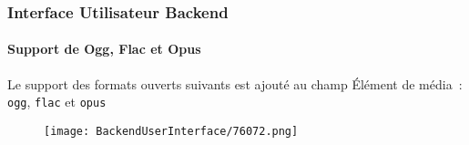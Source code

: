 \begin{frame}[fragile]
	\frametitle{Interface Utilisateur Backend}
	\framesubtitle{Support de Ogg, Flac et Opus}

	Le support des formats ouverts suivants est ajouté au champ Élément de média~:
	\texttt{ogg}, \texttt{flac} et \texttt{opus}

	\begin{figure}
		\texttt{[image: BackendUserInterface/76072.png]}
	\end{figure}

\end{frame}


